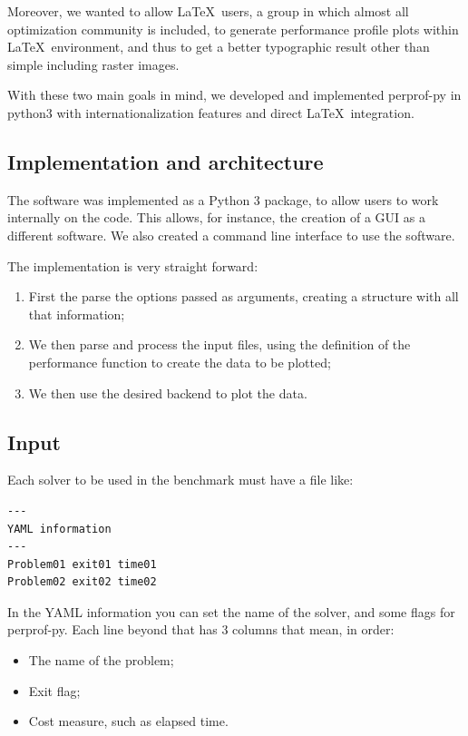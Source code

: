     Moreover,  we wanted to allow \LaTeX\ users, a group in which almost all
    optimization community is included,  to   generate performance profile plots
    within \LaTeX\ environment, and thus to get a better typographic result other
    than simple including raster  images.

    With these two main goals in mind, we developed and implemented perprof-py
    in python3 with internationalization features and direct \LaTeX\ integration.

\subsection*{Implementation and architecture}

    The software was implemented as a Python 3 package, to allow users to work
    internally on the code. This allows, for instance, the creation of a GUI
    as a different software. We also created a command line interface to use the
    software.

    The implementation is very straight forward:
    \begin{enumerate}
      \item First the parse the options passed as arguments, creating a
        structure with all that information;
      \item We then parse and process the input files, using the definition
        of the performance function to create the data to be plotted;
      \item We then use the desired backend to plot the data.
    \end{enumerate}

\subsection*{Input}

    Each solver to be used in the benchmark must have a file like:

    \begin{verbatim}
---
YAML information
---
Problem01 exit01 time01
Problem02 exit02 time02
    \end{verbatim}

    In the YAML information you can set the name of the solver, and some
    flags for perprof-py.
    Each line beyond that has 3 columns that mean, in order:
    \begin{itemize}
      \item The name of the problem;
      \item Exit flag;
      \item Cost measure, such as elapsed time.
    \end{itemize}

